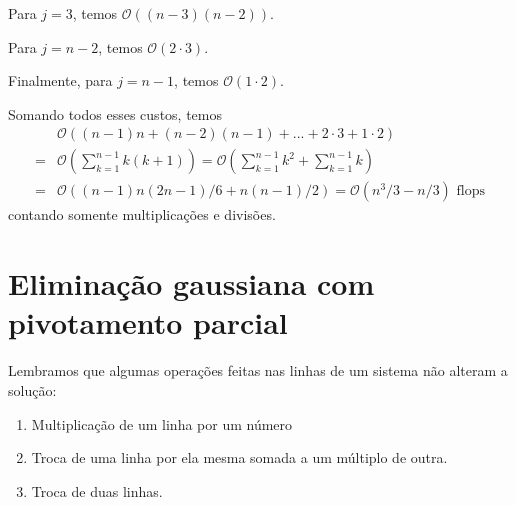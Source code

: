 Para $j=3$, temos $\mathcal{O}((n-3)(n-2))$.

Para $j=n-2$, temos $\mathcal{O}(2\cdot 3)$.

Finalmente, para $j=n-1$, temos $\mathcal{O}(1\cdot 2)$.


Somando todos esses custos, temos
\begin{align*}
  & \mathcal{O}( (n-1)n+(n-2)(n-1)+...+2\cdot 3+1\cdot 2) \\
 =& \mathcal{O}( \sum_{k=1}^{n-1}k(k+1) ) 
 = \mathcal{O}( \sum_{k=1}^{n-1}k^2 + \sum_{k=1}^{n-1}k )\\
 =&\mathcal{O}( (n-1)n(2n-1)/6 + n(n-1)/2) = \mathcal{O}(n^3/3 -n/3) \text{~flops}
\end{align*}
contando somente multiplicações e divisões.







\section{Eliminação gaussiana com pivotamento parcial}
Lembramos que algumas operações feitas nas linhas de um sistema não alteram a solução:
\begin{enumerate}
\item Multiplicação de um linha por um número
\item Troca de uma linha por ela mesma somada a um múltiplo de outra.
\item Troca de duas linhas.
\end{enumerate}

